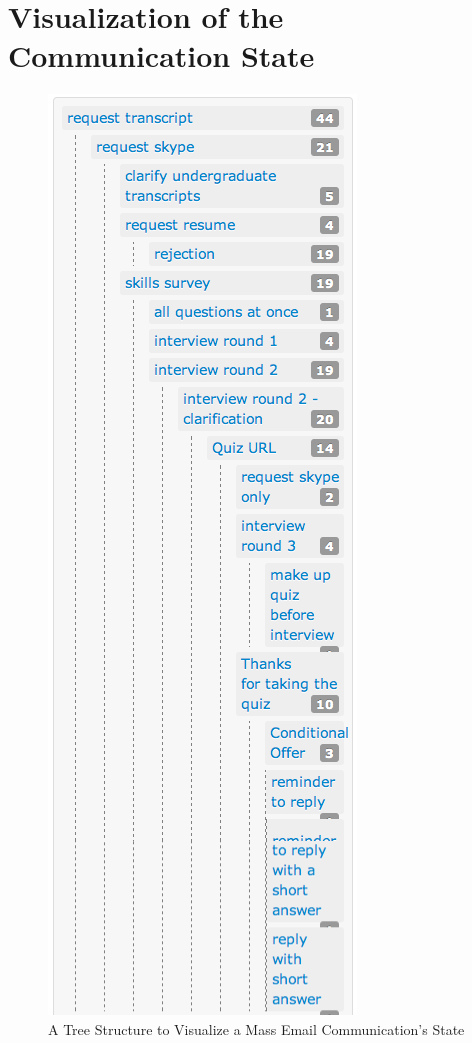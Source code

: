 \clearemptydoublepage
{}
\chapter{Visualization of the Communication State}
\label{app:VisuCommStat}

\begin{figure}[htbp]
	\centering
	\includegraphics[scale=0.55]{imgs/VisualizationOfCommunicationState.png}
	\caption[A Tree Structure to Visualize a Mass Email Communication's State]{A Tree Structure to Visualize a Mass Email Communication's State}
	\label{fig:VisualizationOfCommunicationState}
\end{figure}
\clearemptydoublepage